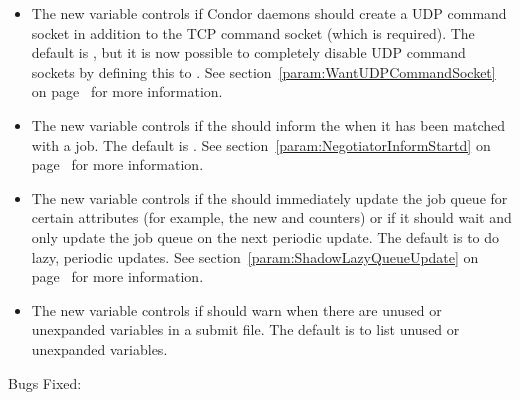 \begin{itemize}

\item The new variable  controls
  if Condor daemons should create a UDP command socket in addition to
  the TCP command socket (which is required).
  The default is , but it is now possible to completely
  disable UDP command sockets by defining this to .
  See section~\ref{param:WantUDPCommandSocket} on
  page~\pageref{param:WantUDPCommandSocket} for more information.

\item The new variable  controls if
  the  should inform the  when it
  has been matched with a job.
  The default is .
  See section~\ref{param:NegotiatorInformStartd} on
  page~\pageref{param:NegotiatorInformStartd} for more information.

\item The new variable  controls if
  the  should immediately update the job queue for
  certain attributes (for example, the new  and
   counters) or if it should wait and only
  update the job queue on the next periodic update.
  The default is  to do lazy, periodic updates.
  See section~\ref{param:ShadowLazyQueueUpdate} on
  page~\pageref{param:ShadowLazyQueueUpdate} for more information.

\item The new variable  
  controls if  should warn when there are unused or
  unexpanded variables in a submit file.  The default is 
  to list unused or unexpanded variables.

\end{itemize}

\noindent Bugs Fixed:

